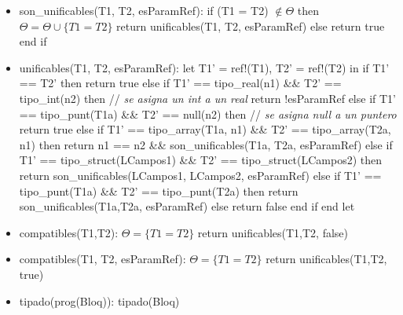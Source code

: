 \documentclass[11pt]{article}
\begin{document}
\begin{itemize}
            \item son\_unificables(T1, T2, esParamRef): 
                \subitem if (T1 = T2) $\notin \Theta$ then
                    \subsubitem $\Theta = \Theta \cup \{T1 = T2\}$
                    \subsubitem return unificables(T1, T2, esParamRef)
                \subitem else
                    \subsubitem return true
                \subitem end if
            \item unificables(T1, T2, esParamRef): 
                \subitem let T1' = ref!(T1), T2' = ref!(T2) in
                    \subsubitem if T1' == T2' then
                        \subsubitem \hspace{2em} return true
                    \subsubitem else if T1' == tipo\_real(n1) \&\&  T2' == tipo\_int(n2) then \/// \textit{se asigna un int a un real}
                        \subsubitem \hspace{2em} return !esParamRef
                    \subsubitem else if T1' == tipo\_punt(T1a) \&\&  T2' == null(n2) then \/// \textit{se asigna null a un puntero}
                        \subsubitem \hspace{2em} return true
                    \subsubitem else if T1' == tipo\_array(T1a, n1) \&\&  T2' == tipo\_array(T2a, n1) then
                        \subsubitem \hspace{2em} return n1 == n2 \&\&  son\_unificables(T1a, T2a, esParamRef)
                    \subsubitem else if T1' == tipo\_struct(LCampos1) \&\&  T2' == tipo\_struct(LCampos2) then
                        \subsubitem \hspace{2em} return son\_unificables(LCampos1, LCampos2, esParamRef)
                    \subsubitem else if T1' == tipo\_punt(T1a) \&\&  T2' == tipo\_punt(T2a) then
                        \subsubitem \hspace{2em} return son\_unificables(T1a,T2a, esParamRef)
                    \subsubitem else
                        \subsubitem \hspace{2em} return false
                    \subsubitem end if 
                \subitem end let
            \item compatibles(T1,T2): 
                \subitem $\Theta = \{T1=T2\} $
                \subitem return unificables(T1,T2, false)
            \item compatibles(T1, T2, esParamRef): 
                \subitem $\Theta = \{T1=T2\} $
                \subitem return unificables(T1,T2, true)
            \item tipado(prog(Bloq)): 
                \subitem tipado(Bloq)

\end{itemize}
\end{document}
